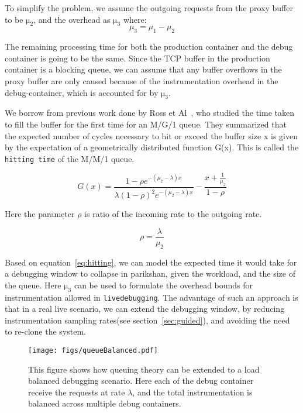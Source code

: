 To simplify the problem, we assume the outgoing requests from the proxy buffer to be $\mathrm{\mu_{2}}$, and the overhead as $\mathrm{\mu_{3}}$ where:\\

\begin{equation}
\mu_{3} = \mu_{1} - \mu_{2} 
\end{equation}

The remaining processing time for both the production container and the debug container is going to be the same. 
Since the TCP buffer in the production container is a blocking queue, we can assume that any buffer overflows in the proxy buffer are only caused because of the instrumentation overhead in the debug-container, which is accounted for by $\mathrm{\mu_{3}}$.

We borrow from previous work done by Ross et Al~\cite{ross1999hitting}, who studied the time taken to fill the buffer for the first time for an M/G/1 queue.
They summarized that the expected number of cycles necessary to hit or exceed the buffer size x is given by the expectation of a geometrically distributed function G(x).
This is called the \texttt{hitting time} of the M/M/1 queue.

\begin{equation}
\label{eq:hitting}
G(x) = \frac{1- \rho e^{-(\mu_2 - \lambda)x}}{\lambda(1 - \rho)^{2}e^{-(\mu_2 - \lambda)x}} - \frac{ x + \frac{1}{\mu_{2}}}{1-\rho}
\end{equation}

Here the parameter $\rho$ is ratio of the incoming rate to the outgoing rate.

\begin{equation}
\rho = \frac{\lambda}{\mu_2}
\end{equation}

Based on equation~\ref{eq:hitting}, we can model the expected time it would take for a debugging window to collapse in parikshan, given the workload, and the size of the queue. 
Here $\mathrm{\mu_{3}}$ can be used to formulate the overhead bounds for instrumentation allowed in \texttt{livedebugging}.
The advantage of such an approach is that in a real live scenario, we can extend the debugging window, by reducing instrumentation sampling rates(see section~\ref{sec:guided}), and avoiding the need to re-clone the system.

\begin{figure}[h]
	\begin{center}
		\texttt{[image: figs/queueBalanced.pdf]}
		\caption{This figure shows how queuing theory can be extended to a load balanced debugging scenario. Here each of the debug container receive the requests at rate $\lambda$, and the total instrumentation is balanced across multiple debug containers.}
		\label{fig:queueBalanced}
	\end{center}
\end{figure}

